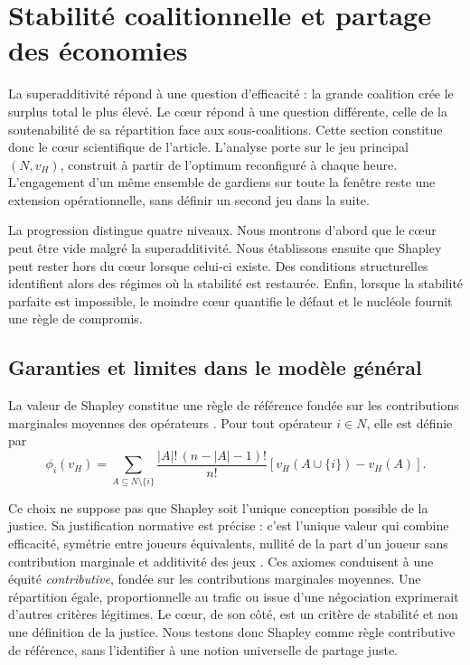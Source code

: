 \newpage

\section{Stabilité coalitionnelle et partage des économies}
\label{sec:jeu_cooperatif}

La superadditivité répond à une question d'efficacité : la grande coalition
crée le surplus total le plus élevé. Le cœur répond à une question différente,
celle de la soutenabilité de sa répartition face aux sous-coalitions. Cette
section constitue donc le cœur scientifique de l'article. L'analyse porte sur
le jeu principal \((N,v_H)\), construit à partir de l'optimum reconfiguré à
chaque heure. L'engagement d'un même ensemble de gardiens sur toute la fenêtre
reste une extension opérationnelle, sans définir un second jeu dans la suite.

La progression distingue quatre niveaux. Nous montrons d'abord que le cœur peut
être vide malgré la superadditivité. Nous établissons ensuite que Shapley peut
rester hors du cœur lorsque celui-ci existe. Des conditions structurelles
identifient alors des régimes où la stabilité est restaurée. Enfin, lorsque la
stabilité parfaite est impossible, le moindre cœur quantifie le défaut et le
nucléole fournit une règle de compromis.

\subsection{Garanties et limites dans le modèle général}

La valeur de Shapley constitue une règle de référence fondée sur les
contributions marginales moyennes des opérateurs
\cite{shapley1953value}. Pour tout opérateur \(i\in N\), elle est définie par
\[
\phi_i(v_H)
=
\sum_{A\subseteq N\setminus\{i\}}
\frac{|A|!\,(n-|A|-1)!}{n!}
\left[v_H(A\cup\{i\})-v_H(A)\right].
\]

Ce choix ne suppose pas que Shapley soit l'unique conception possible de la
justice. Sa justification normative est précise : c'est l'unique valeur qui
combine efficacité, symétrie entre joueurs équivalents, nullité de la part
d'un joueur sans contribution marginale et additivité des jeux
\cite{shapley1953value}. Ces axiomes conduisent à une équité
\emph{contributive}, fondée sur les contributions marginales moyennes. Une
répartition égale, proportionnelle au trafic ou issue d'une négociation
exprimerait d'autres critères légitimes. Le cœur, de son côté, est un critère
de stabilité et non une définition de la justice. Nous testons donc Shapley
comme règle contributive de référence, sans l'identifier à une notion
universelle de partage juste.

